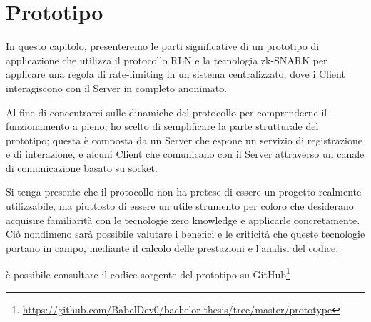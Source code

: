 \chapter{Prototipo}

In questo capitolo, presenteremo le parti significative di un prototipo di applicazione che utilizza il protocollo RLN e
la tecnologia zk-SNARK  per applicare una regola di rate-limiting in un sistema centralizzato, dove i Client
interagiscono con il Server in completo anonimato.

Al fine di concentrarci sulle dinamiche del protocollo per comprenderne il funzionamento a pieno, ho scelto di
semplificare la parte strutturale del prototipo; questa è composta da un Server che espone un servizio di registrazione
e di interazione, e alcuni Client che comunicano con il Server attraverso un canale di comunicazione basato su socket.

Si tenga presente che il protocollo non ha pretese di essere un progetto realmente utilizzabile, ma piuttosto di essere
un utile strumento per coloro che desiderano acquisire familiarità con le tecnologie zero knowledge e applicarle
concretamente. Ciò nondimeno sarà possibile valutare i benefici e le criticità che queste tecnologie portano in campo,
mediante il calcolo delle prestazioni e l'analisi del codice.

è possibile consultare il codice sorgente del prototipo su
GitHub\footnote{\url{https://github.com/BabelDev0/bachelor-thesis/tree/master/prototype}}

